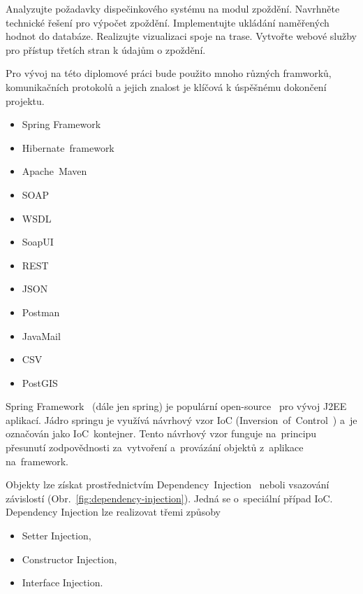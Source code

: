 
Analyzujte požadavky dispečinkového systému na modul zpoždění.
Navrhněte technické řešení pro výpočet zpoždění.
Implementujte ukládání naměřených hodnot do databáze.
Realizujte vizualizaci spoje na trase.
Vytvořte webové služby pro přístup třetích stran k údajům o zpoždění.



Pro vývoj na této diplomové práci bude použito mnoho různých framworků, komunikačních protokolů a jejich znalost je klíčová k úspěšnému dokončení projektu.  
\begin{itemize}
	\setlength{\parskip}{0pt}
	\setlength{\itemsep}{0pt}
	\item {Spring Framework}
	\item {Hibernate~framework}
	\item {Apache~Maven}
	\item {SOAP}
	\item {WSDL}
	\item {SoapUI}
	\item {REST}
	\item {JSON}
	\item {Postman}
	\item {JavaMail}
	\item {CSV}
	\item {PostGIS}
\end{itemize}
Spring Framework~\cite{spring-framework} (dále jen spring) je populární open-source~\cite{open-source} pro vývoj J2EE~\cite{j2ee} aplikací. Jádro springu je využívá návrhový vzor IoC (Inversion~of~Control~\cite{ioc}) a~je označován jako IoC~kontejner. Tento návrhový vzor funguje na~principu přesunutí zodpovědnosti za~vytvoření a~provázání objektů z~aplikace na~framework.

Objekty lze získat prostřednictvím Dependency~Injection~\cite{dependency-injection} neboli vsazování závislostí (Obr.~\ref{fig:dependency-injection}). Jedná se o~speciální případ IoC. Dependency Injection lze realizovat třemi způsoby
\begin{itemize}
	\setlength{\parskip}{0pt}
	\setlength{\itemsep}{0pt}
	\item {Setter Injection,}
	\item {Constructor Injection,}
	\item {Interface Injection.}
\end{itemize}


